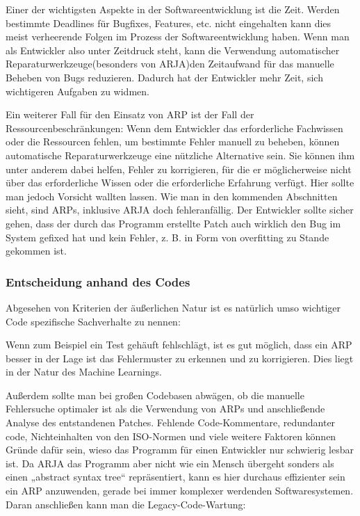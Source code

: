 \documentclass[11pt,a4paper]{article}
\begin{document}
Einer der wichtigsten Aspekte in der Softwareentwicklung ist die Zeit. Werden bestimmte Deadlines für Bugfixes, Features, etc. nicht eingehalten kann dies meist verheerende Folgen im Prozess der Softwareentwicklung haben. Wenn man als Entwickler also unter Zeitdruck steht, kann die Verwendung automatischer Reparaturwerkzeuge(besonders von ARJA)den Zeitaufwand für das manuelle Beheben von Bugs reduzieren. Dadurch hat der Entwickler mehr Zeit, sich wichtigeren Aufgaben zu widmen.

Ein weiterer Fall für den Einsatz von ARP ist der Fall der Ressourcenbeschränkungen: Wenn dem Entwickler das erforderliche Fachwissen oder die Ressourcen fehlen, um bestimmte Fehler manuell zu beheben, können automatische Reparaturwerkzeuge eine nützliche Alternative sein. Sie können ihm unter anderem dabei helfen, Fehler zu korrigieren, für die er möglicherweise nicht über das erforderliche Wissen oder die erforderliche Erfahrung verfügt. Hier sollte man jedoch Vorsicht wallten lassen. Wie man in den kommenden Abschnitten sieht, sind ARPs, inklusive ARJA doch fehleranfällig. Der Entwickler sollte sicher gehen, dass der durch das Programm erstellte Patch auch wirklich den Bug im System gefixed hat und kein Fehler, z. B. in Form von overfitting zu Stande gekommen ist.

\subsubsection{Entscheidung anhand des Codes}

Abgesehen von Kriterien der äußerlichen Natur ist es natürlich umso wichtiger Code spezifische Sachverhalte zu nennen:

Wenn zum Beispiel ein Test gehäuft fehlschlägt, ist es gut möglich, dass ein ARP besser in der Lage ist das Fehlermuster zu erkennen und zu korrigieren. Dies liegt in der Natur des Machine Learnings.

Außerdem sollte man bei großen Codebasen abwägen, ob die manuelle Fehlersuche optimaler ist als die Verwendung von ARPs und anschließende Analyse des entstandenen Patches. Fehlende Code-Kommentare, redundanter code, Nichteinhalten von den ISO-Normen und viele weitere Faktoren können Gründe dafür sein, wieso das Programm für einen Entwickler nur schwierig lesbar ist. Da ARJA das Programm aber nicht wie ein Mensch übergeht sonders als einen „abstract syntax tree“ repräsentiert, kann es hier durchaus effizienter sein ein ARP anzuwenden, gerade bei immer komplexer werdenden Softwaresystemen. Daran anschließen kann man die Legacy-Code-Wartung:
\end{document}
